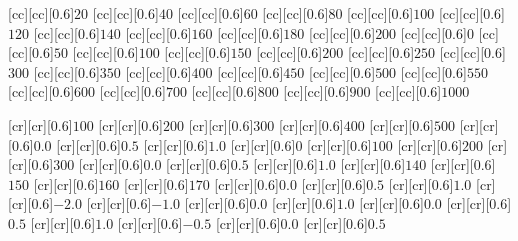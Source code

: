 \newcommand{\tickFig}{0.6}
\newcommand{\labelFig}{0.6}
\newcommand{\legendFig}{0.5}


[cc][cc][\tickFig]{$20$}
[cc][cc][\tickFig]{$40$}
[cc][cc][\tickFig]{$60$}
[cc][cc][\tickFig]{$80$}
[cc][cc][\tickFig]{$100$}
[cc][cc][\tickFig]{$120$}
[cc][cc][\tickFig]{$140$}
[cc][cc][\tickFig]{$160$}
[cc][cc][\tickFig]{$180$}
[cc][cc][\tickFig]{$200$}
[cc][cc][\tickFig]{$0$}
[cc][cc][\tickFig]{$50$}
[cc][cc][\tickFig]{$100$}
[cc][cc][\tickFig]{$150$}
[cc][cc][\tickFig]{$200$}
[cc][cc][\tickFig]{$250$}
[cc][cc][\tickFig]{$300$}
[cc][cc][\tickFig]{$350$}
[cc][cc][\tickFig]{$400$}
[cc][cc][\tickFig]{$450$}
[cc][cc][\tickFig]{$500$}
[cc][cc][\tickFig]{$550$}
[cc][cc][\tickFig]{$600$}
[cc][cc][\tickFig]{$700$}
[cc][cc][\tickFig]{$800$}
[cc][cc][\tickFig]{$900$}
[cc][cc][\tickFig]{$1000$}




[cr][cr][\tickFig]{$ 100$}
[cr][cr][\tickFig]{$ 200$}
[cr][cr][\tickFig]{$ 300$}
[cr][cr][\tickFig]{$ 400$}
[cr][cr][\tickFig]{$ 500$}
[cr][cr][\tickFig]{$ 0.0$}
[cr][cr][\tickFig]{$ 0.5$}
[cr][cr][\tickFig]{$ 1.0$}
[cr][cr][\tickFig]{$ 0$}
[cr][cr][\tickFig]{$ 100$}
[cr][cr][\tickFig]{$ 200$}
[cr][cr][\tickFig]{$ 300$}
[cr][cr][\tickFig]{$ 0.0$}
[cr][cr][\tickFig]{$ 0.5$}
[cr][cr][\tickFig]{$ 1.0$}
[cr][cr][\tickFig]{$ 140$}
[cr][cr][\tickFig]{$ 150$}
[cr][cr][\tickFig]{$ 160$}
[cr][cr][\tickFig]{$ 170$}
[cr][cr][\tickFig]{$ 0.0$}
[cr][cr][\tickFig]{$ 0.5$}
[cr][cr][\tickFig]{$ 1.0$}
[cr][cr][\tickFig]{$-2.0$}
[cr][cr][\tickFig]{$-1.0$}
[cr][cr][\tickFig]{$ 0.0$}
[cr][cr][\tickFig]{$ 1.0$}
[cr][cr][\tickFig]{$ 0.0$}
[cr][cr][\tickFig]{$ 0.5$}
[cr][cr][\tickFig]{$ 1.0$}
[cr][cr][\tickFig]{$-0.5$}
[cr][cr][\tickFig]{$ 0.0$}
[cr][cr][\tickFig]{$ 0.5$}

